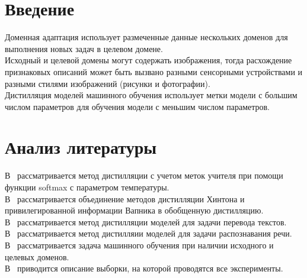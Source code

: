 \newpage


\section{Введение}
Доменная адаптация использует размеченные данные нескольких доменов для выполнения новых задач в целевом домене.\\
Исходный и целевой домены могут содержать изображения, тогда расхождение признаковых описаний может быть вызвано разными сенсорными устройствами и разными стилями изображений (рисунки и фотографии).\\
Дистилляция моделей машинного обучения использует метки модели с большим числом параметров для обучения модели с меньшим числом параметров.\\

\section{Анализ литературы}

В~\cite{Hinton2015} рассматривается метод дистилляции с учетом меток учителя при помощи функции softmax с параметром температуры.\\
В~\cite{Vapnik2016} рассматривается объединение методов дистилляции Хинтона и привилегированной информации Вапника в обобщенную дистилляцию.\\
В~\cite{KimRush2016} рассматривается метод дистилляции моделей для задачи перевода текстов.\\
В~\cite{MDASR} рассматривается метод дистилляии моделей для задачи распознавания речи.\\
В~\cite{DeepvisDA} рассматривается задача машинного обучения при наличии исходного и целевых доменов.\\
В~\cite{FMNIST} приводится описание выборки, на которой проводятся все эксперименты.
